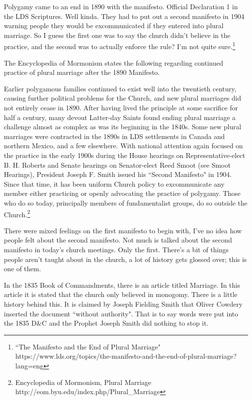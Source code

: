 Polygamy came to an end in 1890 with the manifesto. Official Declaration 1 in the
LDS Scriptures. Well kinda. They had to put out a second manifesto in 1904 warning
people they would be excommunicated if they entered into plural marriage. So I guess
the first one was to say the church didn't believe in the practice, and the second
was to actually enforce the rule? I'm not quite sure.\footnote{
``The Manifesto and the End of Plural Marriage"
https://www.lds.org/topics/the-manifesto-and-the-end-of-plural-marriage?lang=eng
}

The Encyclopedia of Mormonism states the following regarding continued practice of
plural marriage after the 1890 Manifesto.

\begin{displayquote}
Earlier polygamous families continued to exist well into the twentieth century,
causing further political problems for the Church, and new plural marriages did not
entirely cease in 1890. After having lived the principle at some sacrifice for half a
century, many devout Latter-day Saints found ending plural marriage a challenge
almost as complex as was its beginning in the 1840s. Some new plural marriages were
contracted in the 1890s in LDS settlements in Canada and northern Mexico, and a few
elsewhere. With national attention again focused on the practice in the early 1900s
during the House hearings on Representative-elect B. H. Roberts and Senate hearings
on Senator-elect Reed Smoot (see Smoot Hearings), President Joseph F. Smith issued
his ``Second Manifesto" in 1904. Since that time, it has been uniform Church policy 
to excommunicate any member either practicing or openly advocating the practice of
polygamy. Those who do so today, principally members of fundamentalist groups, do so
outside the Church.\footnote{Encyclopedia of Mormonism, Plural Marriage
http://eom.byu.edu/index.php/Plural_Marriage}
\end{displayquote}

There were mixed feelings on the first manifesto to begin with, I've no idea how
people felt about the second manifesto. Not much is talked about the second manifesto
in today's church meetings. Only the first. There's a bit of things people aren't
taught about in the church, a lot of history gets glossed over; this is one of them.

In the 1835 Book of Commandments, there is an article titled Marriage. In this
article it is stated that the church only believed in monogomy. There is a little
history behind this. It is claimed by Joseph Fielding Smith that Oliver Cowdery
inserted the document ``without authority". That is to say words were put into the
1835 D\&C and the Prophet Joseph Smith did nothing to stop it.

